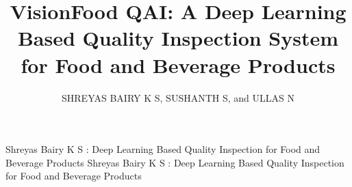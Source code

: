 \documentclass{ieeeaccess}
\begin{document}

\title{VisionFood QAI: A Deep Learning Based Quality Inspection System for Food and Beverage Products}

\author{\uppercase{Shreyas Bairy K S},
\uppercase{Sushanth S}, and
\uppercase{Ullas N}}
\address[1]{Department of Computer Science and Engineering (Data Science),
B.M.S. College of Engineering (Autonomous Institute, Affiliated to VTU), Bengaluru--560019, India}


\markboth
{Shreyas Bairy K S \headeretal: Deep Learning Based Quality Inspection for Food and Beverage Products}
{Shreyas Bairy K S \headeretal: Deep Learning Based Quality Inspection for Food and Beverage Products}

\end{document}
